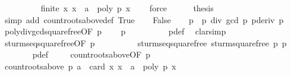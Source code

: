 \begin{isabellebody}
\ \ \ \ \ \ \ \ \isamarkupfalse%
\ {\isachardoublequoteopen}{\isasymnot}finite\ {\isacharbraceleft}x{\isachardot}\ x\ {\isachargreater}\ a\ {\isasymand}\ poly\ p\ x\ {\isacharequal}\ {}{\isacharbraceright}{\isachardoublequoteclose}\ \isamarkupfalse%
\ force\isanewline
\ \ \ \ \isamarkupfalse%
\ {\isacharquery}thesis\ \isamarkupfalse%
\ {\isacharparenleft}simp\ add{\isacharcolon}\ count{\isacharunderscore}roots{\isacharunderscore}above{\isacharunderscore}def\ True{\isacharparenright}\isanewline
{}\isamarkupfalse%
\isanewline
\ \ \isamarkupfalse%
\ False\isanewline
\ \ \isamarkupfalse%
\ p{\isacharprime}\ {\isasymequiv}\ {\isachardoublequoteopen}p\ div\ {\isacharparenleft}gcd\ p\ {\isacharparenleft}pderiv\ p{\isacharparenright}{\isacharparenright}{\isachardoublequoteclose}\isanewline
\ \ \isamarkupfalse%
\ poly{\isacharunderscore}div{\isacharunderscore}gcd{\isacharunderscore}squarefree{\isacharparenleft}{}{\isacharparenright}{\isacharbrackleft}OF\ {\isacharbackquoteopen}p\ {\isasymnoteq}\ {}{\isacharbackquoteclose}{\isacharbrackright}\ \isamarkupfalse%
\ {\isachardoublequoteopen}p{\isacharprime}\ {\isasymnoteq}\ {}{\isachardoublequoteclose}\isanewline
\ \ \ \ \ \ \isamarkupfalse%
\ p{\isacharprime}{\isacharunderscore}def\ \isamarkupfalse%
\ clarsimp\isanewline
\isanewline
\ \ \isamarkupfalse%
\ sturm{\isacharunderscore}seq{\isacharunderscore}squarefree{\isacharbrackleft}OF\ {\isacharbackquoteopen}p\ {\isasymnoteq}\ {}{\isacharbackquoteclose}{\isacharbrackright}\isanewline
\ \ \ \ \ \ \isamarkupfalse%
\ sturm{\isacharunderscore}seq{\isacharunderscore}squarefree\ {\isachardoublequoteopen}sturm{\isacharunderscore}squarefree\ p{\isachardoublequoteclose}\ p{\isacharprime}\isanewline
\ \ \ \ \ \ \isamarkupfalse%
\ p{\isacharprime}{\isacharunderscore}def\ \isacommand{{\isachardot}}\isamarkupfalse%
\isanewline
\ \ \isamarkupfalse%
\ count{\isacharunderscore}roots{\isacharunderscore}above{\isacharbrackleft}OF\ {\isacharbackquoteopen}p{\isacharprime}\ {\isasymnoteq}\ {}{\isacharbackquoteclose}{\isacharbrackright}\isanewline
\ \ \ \ \ \ \isamarkupfalse%
\ {\isachardoublequoteopen}count{\isacharunderscore}roots{\isacharunderscore}above\ p\ a\ {\isacharequal}\ card\ {\isacharbraceleft}x{\isachardot}\ x\ {\isachargreater}\ a\ {\isasymand}\ poly\ p{\isacharprime}\ x\ {\isacharequal}\ {}{\isacharbraceright}{\isachardoublequoteclose}\isanewline

\end{isabellebody}
